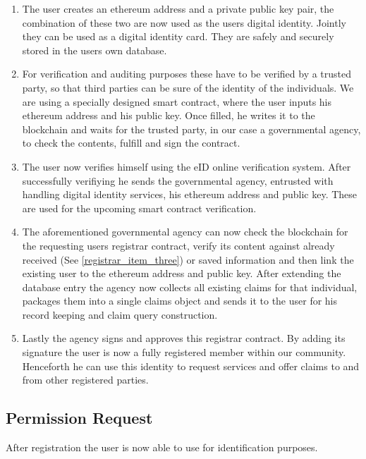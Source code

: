\begin{enumerate}
\item \label{registrar_item_one}
The user creates an ethereum address and a private public key pair, the combination of these two are now used as the users digital identity. Jointly they can be used as a digital identity card. They are safely and securely stored in the users own database.
\item \label{registrar_item_two}
For verification and auditing purposes these have to be verified by a trusted party, so that third parties can be sure of the identity of the individuals. We are using a specially designed smart contract, where the user inputs his ethereum address and his public key. Once filled, he writes it to the blockchain and waits for the trusted party, in our case a governmental agency, to check the contents, fulfill and sign the contract.
\item \label{registrar_item_three}
The user now verifies himself using the eID online verification system. After successfully verifiying he sends the governmental agency, entrusted with handling digital identity services, his ethereum address and public key. These are used for the upcoming smart contract verification.
\begin{comment}
DONT NEED: The user can now have his ethereum address and private public key pair verified by a governmental agency.
\end{comment}
\item \label{registrar_item_four}
The aforementioned governmental agency can now check the blockchain for the requesting users registrar contract, verify its content against already received (See \ref{registrar_item_three}) or saved information and then link the existing user to the ethereum address and public key. After extending the database entry the agency now collects all existing claims for that individual, packages them into a single claims object and sends it to the user for his record keeping and claim query construction.  
\item \label{registrar_item_five}
Lastly the agency signs and approves this registrar contract. By adding its signature the user is now a fully registered member within our community. Henceforth he can use this identity to request services and offer claims to and from other registered parties. 
\end{enumerate}

\subsection{Permission Request}
After registration the user is now able to use \projectName{} for identification purposes. 

